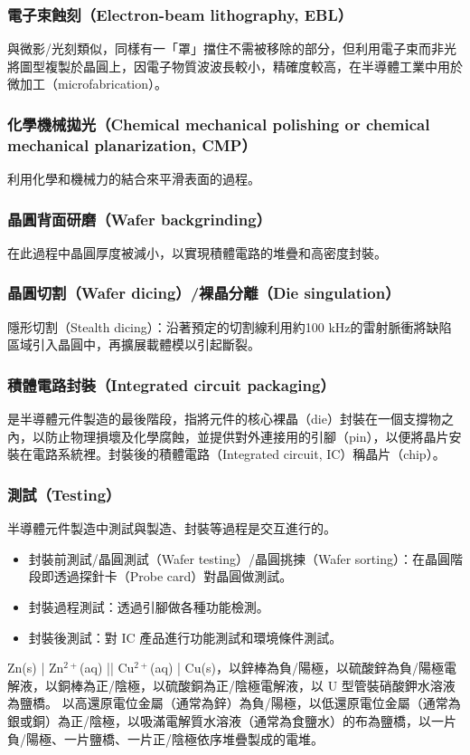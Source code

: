 \documentclass[a4paper,12pt]{report}
\begin{document}
\begin{itemize}
\subsubsection{電子束蝕刻（Electron-beam lithography, EBL）}
與微影/光刻類似，同樣有一「罩」擋住不需被移除的部分，但利用電子束而非光將圖型複製於晶圓上，因電子物質波波長較小，精確度較高，在半導體工業中用於微加工（microfabrication）。
\subsubsection{化學機械拋光（Chemical mechanical polishing or chemical mechanical planarization, CMP）}
利用化學和機械力的結合來平滑表面的過程。
\subsubsection{晶圓背面研磨（Wafer backgrinding）}
在此過程中晶圓厚度被減小，以實現積體電路的堆疊和高密度封裝。
\subsubsection{晶圓切割（Wafer dicing）/裸晶分離（Die singulation）}
隱形切割（Stealth dicing）：沿著預定的切割線利用約100 kHz的雷射脈衝將缺陷區域引入晶圓中，再擴展載體模以引起斷裂。
\subsubsection{積體電路封裝（Integrated circuit packaging）}
是半導體元件製造的最後階段，指將元件的核心裸晶（die）封裝在一個支撐物之內，以防止物理損壞及化學腐蝕，並提供對外連接用的引腳（pin），以便將晶片安裝在電路系統裡。封裝後的積體電路（Integrated circuit, IC）稱晶片（chip）。
\subsubsection{測試（Testing）}
半導體元件製造中測試與製造、封裝等過程是交互進行的。
\begin{itemize}
\item 封裝前測試/晶圓測試（Wafer testing）/晶圓挑揀（Wafer sorting）：在晶圓階段即透過探針卡（Probe card）對晶圓做測試。
\item 封裝過程測試：透過引腳做各種功能檢測。
\item 封裝後測試：對 IC 產品進行功能測試和環境條件測試。
\end{itemize}
Zn(s) | Zn$^{2+}$(aq) || Cu$^{2+}$(aq) | Cu(s)，以鋅棒為負/陽極，以硫酸鋅為負/陽極電解液，以銅棒為正/陰極，以硫酸銅為正/陰極電解液，以 U 型管裝硝酸鉀水溶液為鹽橋。
以高還原電位金屬（通常為鋅）為負/陽極，以低還原電位金屬（通常為銀或銅）為正/陰極，以吸滿電解質水溶液（通常為食鹽水）的布為鹽橋，以一片負/陽極、一片鹽橋、一片正/陰極依序堆疊製成的電堆。

\end{itemize}
\end{document}

